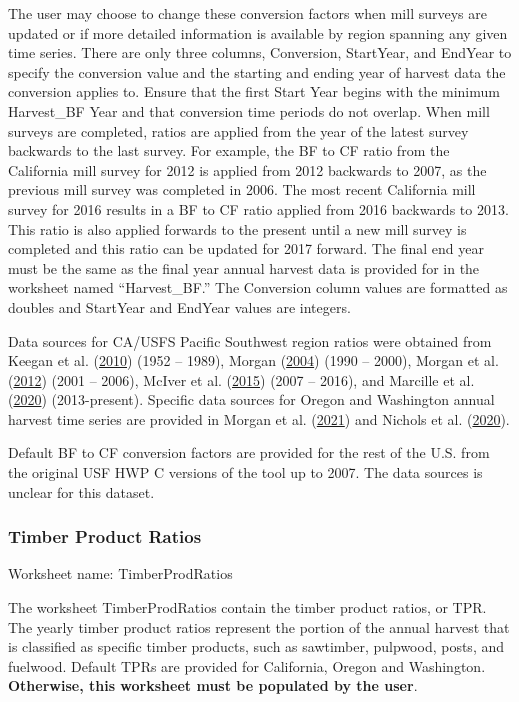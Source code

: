 \documentclass[
  openany]{book}
\begin{document}
The user may choose to change these conversion factors when mill surveys
are updated or if more detailed information is available by region
spanning any given time series. There are only three columns,
Conversion, StartYear, and EndYear to specify the conversion value and
the starting and ending year of harvest data the conversion applies to.
Ensure that the first Start Year begins with the minimum Harvest\_BF
Year and that conversion time periods do not overlap. When mill surveys
are completed, ratios are applied from the year of the latest survey
backwards to the last survey. For example, the BF to CF ratio from the
California mill survey for 2012 is applied from 2012 backwards to 2007,
as the previous mill survey was completed in 2006. The most recent
California mill survey for 2016 results in a BF to CF ratio applied from
2016 backwards to 2013. This ratio is also applied forwards to the
present until a new mill survey is completed and this ratio can be
updated for 2017 forward. The final end year must be the same as the
final year annual harvest data is provided for in the worksheet named
``Harvest\_BF.'' The Conversion column values are formatted as doubles
and StartYear and EndYear values are integers.

Data sources for CA/USFS Pacific Southwest region ratios were obtained
from Keegan et al. (\protect\hyperlink{ref-keegan2010}{2010}) (1952 --
1989), Morgan (\protect\hyperlink{ref-morgan2004}{2004}) (1990 -- 2000),
Morgan et al. (\protect\hyperlink{ref-morgan2012}{2012}) (2001 -- 2006),
McIver et al. (\protect\hyperlink{ref-mciver2015}{2015}) (2007 -- 2016),
and Marcille et al. (\protect\hyperlink{ref-marcille2020}{2020})
(2013-present). Specific data sources for Oregon and Washington annual
harvest time series are provided in Morgan et al.
(\protect\hyperlink{ref-morgan2021}{2021}) and Nichols et al.
(\protect\hyperlink{ref-nichols2020}{2020}).

Default BF to CF conversion factors are provided for the rest of the
U.S. from the original USF HWP C versions of the tool up to 2007. The
data sources is unclear for this dataset.

\hypertarget{own-prov-input-tpr}{%
\subsubsection{Timber Product Ratios}\label{own-prov-input-tpr}}

Worksheet name: TimberProdRatios

The worksheet TimberProdRatios contain the timber product ratios, or
TPR. The yearly timber product ratios represent the portion of the
annual harvest that is classified as specific timber products, such as
sawtimber, pulpwood, posts, and fuelwood. Default TPRs are provided for
California, Oregon and Washington. \textbf{Otherwise, this worksheet
must be populated by the user}.
\end{document}
